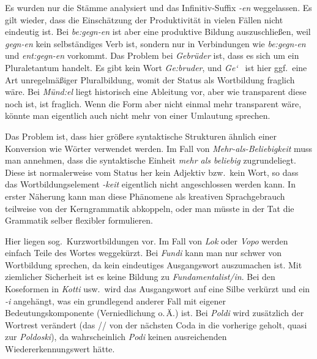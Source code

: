 \begin{sloppypar}

Es wurden nur die Stämme analysiert und das Infinitiv-Suffix \textit{-en} weggelassen.
Es gilt wieder, dass die Einschätzung der Produktivität in vielen Fällen nicht eindeutig ist.
Bei \textit{be:gegn-en} ist aber \zB eine produktive Bildung auszuschließen, weil \textit{gegn-en} kein selbständiges Verb ist, sondern nur in Verbindungen wie \textit{be:gegn-en} und \textit{ent:gegn-en} vorkommt.
Das Problem bei \textit{Gebrüder} ist, dass es sich um ein Pluraletantum handelt.
Es gibt kein Wort \textit{\Ast Ge:bruder}, und \textit{Ge\char`~} ist hier ggf.\ eine Art unregelmäßiger Pluralbildung, womit der Status als Wortbildung fraglich wäre.
Bei \textit{Münd:el} liegt historisch eine Ableitung vor, aber wie transparent diese noch ist, ist fraglich.
Wenn die Form aber nicht einmal mehr transparent wäre, könnte man eigentlich auch nicht mehr von einer Umlautung sprechen.

\end{sloppypar}


Das Problem ist, dass hier größere syntaktische Strukturen ähnlich einer Konversion wie Wörter verwendet werden.
Im Fall von \textit{Mehr-als-Beliebigkeit} muss man \zB annehmen, dass die syntaktische Einheit \textit{mehr als beliebig} zugrundeliegt.
Diese ist normalerweise vom Status her kein Adjektiv bzw.\ kein Wort, so dass das Wortbildungselement \textit{-keit} eigentlich nicht angeschlossen werden kann.
In erster Näherung kann man diese Phänomene als kreativen Sprachgebrauch teilweise von der Kerngrammatik abkoppeln, oder man müsste in der Tat die Grammatik selber flexibler formulieren.


Hier liegen sog.\ Kurzwortbildungen vor.
Im Fall von \textit{Lok} oder \textit{Vopo} werden einfach Teile des Wortes weggekürzt.
Bei \textit{Fundi} kann man nur schwer von Wortbildung sprechen, da kein eindeutiges Ausgangswort auszumachen ist.
Mit ziemlicher Sicherheit ist es keine Bildung zu \textit{Fundamentalist\slash in}.
Bei den Koseformen in \textit{Kotti} usw.\ wird das Ausgangswort auf eine Silbe verkürzt und ein \textit{-i} angehängt, was ein grundlegend anderer Fall mit eigener Bedeutungskomponente (Verniedlichung o.\,Ä.) ist.
Bei \textit{Poldi} wird zusätzlich der Wortrest verändert (das // von der nächsten Coda in die vorherige geholt, quasi zur \textit{Poldoski}), da wahrscheinlich \textit{Podi} keinen ausreichenden Wiedererkennungswert hätte.

